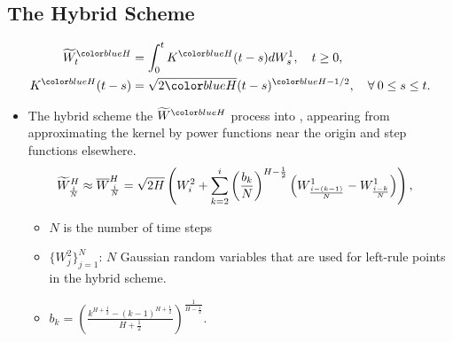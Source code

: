 \documentclass[ima, 20pt, portrait, plainboxedsections]{sciposter}
\begin{document}
\begin{multicols}{3}
\section*{The Hybrid Scheme \cite{bennedsen2017hybrid}}
\begin{align*}
	\widetilde{W}_t^{\blue{H}} &= \int_0^t K^{\blue{H}}(t-s) dW_s^1, \quad t \ge 0, \\ 	K^{\blue{H}}(t-s) &= \sqrt{2\blue{H}} (t-s)^{\blue{H} - 1/2},\quad \forall \: 0 \le s \le t. 
	\end{align*}
\begin{itemize}
\item 	The hybrid scheme  the  $\widetilde{W}^\blue{H}$ process into , appearing from approximating the kernel by power functions near the origin and step functions elsewhere.
\begin{align*}
\widetilde{W}^H_{\frac{i}{N}} \approx \overline{W}^H_{\frac{i}{N}}&= \sqrt{2H} \left(  W^2_i+\sum_{k=2}^{i} \left(\frac{b_k}{N}\right)^{H-\frac{1}{2}} \left(W_{\frac{i-(k-1)}{N}}^1-W_{\frac{i-k}{N}}^1\right)\right),
\end{align*}
\begin{itemize}
\item $N$ is the number of time steps 
\item $\{W^{2}_j\}_{j=1}^N$:  $N$ Gaussian random variables that are used for left-rule points in the hybrid scheme.
\item $b_k=\left(\frac{k^{H+\frac{1}{2}}-(k-1)^{H+\frac{1}{2} }}{H+\frac{1}{2}}\right)^{\frac{1}{H-\frac{1}{2}}}.$
\end{itemize}
\end{itemize}

\end{multicols}
\end{document}
